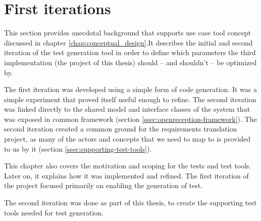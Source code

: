 \chapter{First iterations}
\label{chapter:first-iterations}
This section provides anecdotal background that supports use case tool concept discussed in chapter \ref{chap:conceptual_design}.It describes the initial and second iteration of the test generation tool in order to define which parameters the third implementation (the project of this thesis) should -- and shouldn't -- be optimized by.\medskip

\noindent The first iteration was developed using a simple form of code generation. It was a simple experiment that proved itself useful enough to refine. The second iteration was linked directly to the shared model and interface classes of the system that was exposed in common framework (section \ref{ssec:openreception-framework}). The second iteration created a common ground for the requirements translation project, as many of the actors and concepts that we need to map to is provided to us by it (section \ref{ssec:supporting-test-tools}).\medskip

\noindent This chapter also covers the motivation and scoping for the tests and test tools. Later on, it explains how it was implemented and refined. The first iteration of the project focused primarily on enabling the generation of test.\medskip

\noindent The second iteration was done as part of this thesis, to create the supporting test tools needed for test generation.

